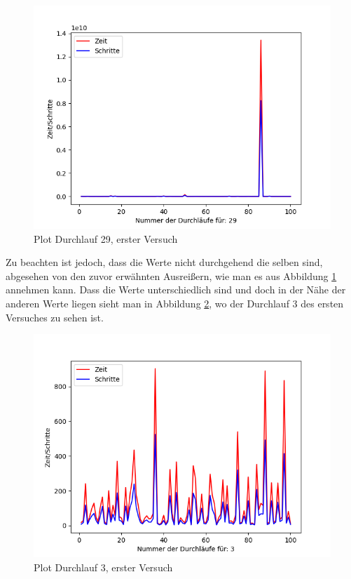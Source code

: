 \documentclass[11pt, a4paper]{article}
\begin{document}
\begin{figure}[h]
\centering
\includegraphics[scale=.5]{29.png}
\caption{Plot Durchlauf 29, erster Versuch}
\label{fig:Plot 29}
\end{figure}

Zu beachten ist jedoch, dass die Werte nicht durchgehend die selben sind, abgesehen von den zuvor erwähnten Ausreißern, wie man es aus Abbildung \ref{fig:Plot 29} annehmen kann. Dass die Werte unterschiedlich sind und doch in der Nähe der anderen Werte liegen sieht man in Abbildung \ref{fig:Plot 3}, wo der Durchlauf 3 des ersten Versuches zu sehen ist.


\begin{figure}[h]
\centering
\includegraphics[scale=.5]{3.png}
\caption{Plot Durchlauf 3, erster Versuch}
\label{fig:Plot 3}
\end{figure}
\end{document}
